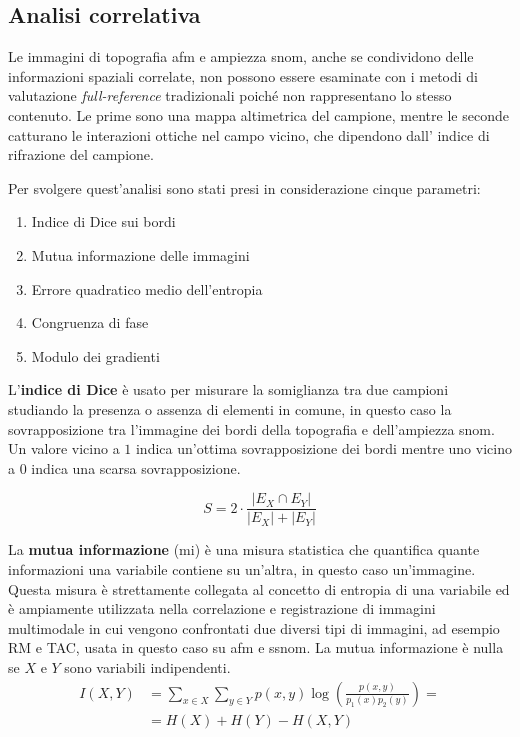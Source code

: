 \documentclass[../main.tex]{subfiles}
\begin{document}
\subsection{Analisi correlativa}

Le immagini di topografia \acrshort{afm} e ampiezza \acrshort{snom}, anche se condividono delle informazioni spaziali correlate, non possono essere esaminate con i metodi di valutazione \textit{full-reference} tradizionali poiché non rappresentano lo stesso contenuto. Le prime sono una mappa altimetrica del campione, mentre le seconde catturano le interazioni ottiche nel campo vicino, che dipendono dall' indice di rifrazione del campione.

Per svolgere quest'analisi sono stati presi in considerazione cinque parametri:

\begin{enumerate}
	\itemsep0em
	\item Indice di Dice sui bordi
	\item Mutua informazione delle immagini
	\item Errore quadratico medio dell'entropia
	\item Congruenza di fase
	\item Modulo dei gradienti
\end{enumerate}

L'\textbf{indice di Dice} è usato per misurare la somiglianza tra due campioni studiando la presenza o assenza di elementi in comune, in questo caso la sovrapposizione tra l'immagine dei bordi della topografia e dell'ampiezza \acrshort{snom}. Un valore vicino a $1$ indica un'ottima sovrapposizione dei bordi mentre uno vicino a $0$ indica una scarsa sovrapposizione.\cite{carass_2020}

\begin{equation}
	S = 2\cdot \frac{\left|E_{X} \cap  E_{Y}\right|}{\left|E_{X}\right| + \left|E_{Y}\right|}
\end{equation}

La \textbf{mutua informazione} (\acrshort{mi}) è una misura statistica che quantifica quante informazioni una variabile contiene su un'altra, in questo caso un'immagine.\cite{shannon_1948} Questa misura è strettamente collegata al concetto di entropia di una variabile ed è ampiamente utilizzata nella correlazione e registrazione di immagini multimodale in cui vengono confrontati due diversi tipi di immagini,\cite{viola_1997} ad esempio RM e TAC,\cite{mclaughlin_2004, veninga_2004} usata in questo caso su \acrshort{afm} e \acrshort{ssnom}. La mutua informazione è nulla se $X$ e $Y$ sono variabili indipendenti.
\begin{equation}
	\begin{aligned}
		I(X,Y)  &= \sum_{x\in X}\sum_{y\in Y} p(x,y) \log\left(\frac{p(x,y)}{p_1(x)p_2(y)}\right) =\\
		&= H(X) + H(Y) - H(X,Y)
	\end{aligned}
\end{equation}
\end{document}

